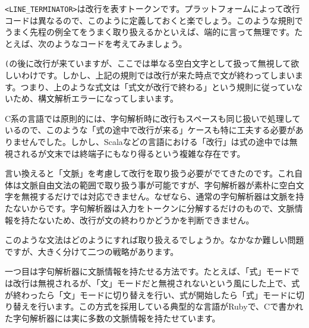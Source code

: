 \texttt{\textless{}LINE\_TERMINATOR\textgreater{}}は改行を表すトークンです。プラットフォームによって改行コードは異なるので、このように定義しておくと楽でしょう。このような規則でうまく先程の例全てをうまく取り扱えるかといえば、端的に言って無理です。たとえば、次のようなコードを考えてみましょう。

\begin{Shaded}
\begin{Highlighting}[]
\NormalTok{(}
  \NormalTok{)}
\end{Highlighting}
\end{Shaded}

\texttt{(}の後に改行が来ていますが、ここでは単なる空白文字として扱って無視して欲しいわけです。しかし、上記の規則では改行が来た時点で文が終わってしまいます。つまり、上のような式文は「式文が改行で終わる」という規則に従っていないため、構文解析エラーになってしまいます。

C系の言語では原則的には、字句解析時に改行もスペースも同じ扱いで処理しているので、このような「式の途中で改行が来る」ケースも特に工夫する必要がありませんでした。しかし、Scalaなどの言語における「改行」は式の途中では無視されるが文末では終端子にもなり得るという複雑な存在です。

言い換えると「文脈」を考慮して改行を取り扱う必要がでてきたのです。これ自体は文脈自由文法の範囲で取り扱う事が可能ですが、字句解析器が素朴に空白文字を無視するだけでは対応できません。なぜなら、通常の字句解析器は文脈を持たないからです。字句解析器は入力をトークンに分解するだけのもので、文脈情報を持たないため、改行が文の終わりかどうかを判断できません。

このような文法はどのようにすれば取り扱えるでしょうか。なかなか難しい問題ですが、大きく分けて二つの戦略があります。

一つ目は字句解析器に文脈情報を持たせる方法です。たとえば、「式」モードでは改行は無視されるが、「文」モードだと無視されないという風にした上で、式が終わったら「文」モードに切り替えを行い、式が開始したら「式」モードに切り替えを行います。この方式を採用している典型的な言語がRubyで、Cで書かれた字句解析器には実に多数の文脈情報を持たせています。

